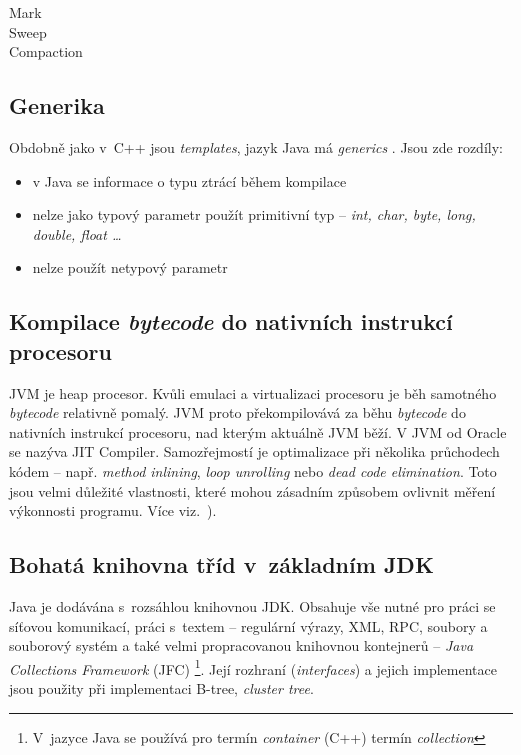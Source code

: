 \begin{description}
  \item[Mark] 
  \item[Sweep] 
  \item[Compaction]
\end{description}

\subsection{Generika}

Obdobně jako v~C++ jsou \emph{templates}\cite{ISO:2012:CPP}, jazyk Java má \emph{generics} \cite{gosling2013java}.
Jsou zde rozdíly:
\begin{itemize}
  \item v Java se informace o typu ztrácí během kompilace
  \item nelze jako typový parametr použít primitivní typ -- \emph{int, char, byte, long, double, float \ldots}
  \item nelze použít netypový parametr
\end{itemize}


\subsection{Kompilace \emph{bytecode} do nativních instrukcí procesoru}

JVM je heap procesor. Kvůli emulaci a virtualizaci procesoru je
běh samotného \emph{bytecode} relativně pomalý. JVM proto překompilovává
za běhu \emph{bytecode} do nativních instrukcí procesoru, nad kterým
aktuálně JVM běží. V JVM od Oracle se nazýva JIT Compiler\cite{hunt2011java}. Samozřejmostí je optimalizace při několika průchodech
kódem -- např. \emph{method inlining}, \emph{loop unrolling} nebo \emph{dead code elimination}\cite{hunt2011java}. Toto jsou velmi důležité vlastnosti, které mohou zásadním způsobem
ovlivnit měření výkonnosti programu. Více viz.~).


\subsection{Bohatá knihovna tříd v~základním JDK}

Java je dodávána s~rozsáhlou knihovnou JDK\@. Obsahuje vše nutné
pro práci se síťovou komunikací, práci s~textem -- regulární výrazy,
XML, RPC, soubory a souborový
systém a také velmi propracovanou knihovnou kontejnerů -- \emph{Java
Collections Framework }(JFC)%
\footnote{V~jazyce Java se používá pro termín\emph{ container} (C++) termín
\emph{collection} %
}\@. Její rozhraní (\emph{interfaces}) a jejich implementace jsou
použity při implementaci B-tree, \emph{cluster tree}.

